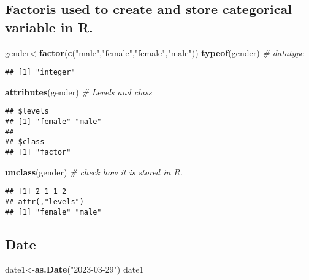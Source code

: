 \documentclass[
]{article}
\newenvironment{Shaded}{\begin{snugshade}}{\end{snugshade}}
\newcommand{\CommentTok}[1]{\textcolor[rgb]{0.56,0.35,0.01}{\textit{#1}}}
\newcommand{\FunctionTok}[1]{\textcolor[rgb]{0.13,0.29,0.53}{\textbf{#1}}}
\newcommand{\NormalTok}[1]{#1}
\newcommand{\OtherTok}[1]{\textcolor[rgb]{0.56,0.35,0.01}{#1}}
\newcommand{\StringTok}[1]{\textcolor[rgb]{0.31,0.60,0.02}{#1}}
\begin{document}
\subsection{Factoris used to create and store categorical variable in
R.}\label{factoris-used-to-create-and-store-categorical-variable-in-r.}

\begin{Shaded}
\begin{Highlighting}[]
\NormalTok{gender}\OtherTok{\textless{}{-}}\FunctionTok{factor}\NormalTok{(}\FunctionTok{c}\NormalTok{(}\StringTok{"male"}\NormalTok{,}\StringTok{"female"}\NormalTok{,}\StringTok{"female"}\NormalTok{,}\StringTok{"male"}\NormalTok{))}
\FunctionTok{typeof}\NormalTok{(gender) }\CommentTok{\# datatype}
\end{Highlighting}
\end{Shaded}

\begin{verbatim}
## [1] "integer"
\end{verbatim}

\begin{Shaded}
\begin{Highlighting}[]
\FunctionTok{attributes}\NormalTok{(gender)  }\CommentTok{\# Levels and class}
\end{Highlighting}
\end{Shaded}

\begin{verbatim}
## $levels
## [1] "female" "male"  
## 
## $class
## [1] "factor"
\end{verbatim}

\begin{Shaded}
\begin{Highlighting}[]
\FunctionTok{unclass}\NormalTok{(gender) }\CommentTok{\# check how it is stored in R.}
\end{Highlighting}
\end{Shaded}

\begin{verbatim}
## [1] 2 1 1 2
## attr(,"levels")
## [1] "female" "male"
\end{verbatim}

\subsection{Date}\label{date}

\begin{Shaded}
\begin{Highlighting}[]
\NormalTok{date1}\OtherTok{\textless{}{-}}\FunctionTok{as.Date}\NormalTok{(}\StringTok{"2023{-}03{-}29"}\NormalTok{)}
\NormalTok{date1}
\end{Highlighting}
\end{Shaded}
\end{document}
